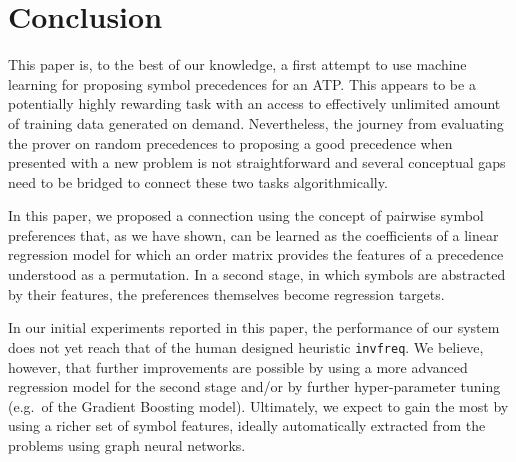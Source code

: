 \section{Conclusion}

This paper is, to the best of our knowledge, a first attempt to use machine learning for proposing symbol precedences for an ATP. 
This appears to be a potentially highly rewarding task with an access to effectively unlimited amount of training data generated on demand.
Nevertheless, the journey from evaluating the prover on random precedences to proposing a good precedence when presented 
with a new problem is not straightforward and several conceptual gaps need to be bridged to connect these two tasks algorithmically. 

In this paper, we proposed a connection using the concept of pairwise symbol preferences that, as we have shown,
can be learned as the coefficients of a linear regression model for 
which an order matrix provides the features of a precedence understood as a permutation. 
In a second stage, in which symbols are abstracted by their features, the preferences themselves become regression targets.

In our initial experiments reported in this paper, the performance of our system does not
yet reach that of the human designed heuristic \texttt{invfreq}. We believe, however,
that further improvements are possible by using a more advanced regression model for the second stage
and/or by further hyper-parameter tuning (e.g.~of the Gradient Boosting model).
Ultimately, we expect to gain the most by using a richer set of symbol features,
ideally automatically extracted from the problems using graph neural networks. 





